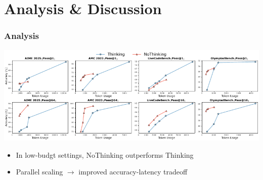 \documentclass[student, noshadow, lsr, english, aspectratio=169]{ITR_LSR_slides}
\begin{document}
\section{Analysis \& Discussion}

\begin{frame}
	\frametitle{Analysis}
	\centering
    \includegraphics[width=\textwidth]{Fig6_Result.pdf}
	\begin{itemize}
		\item In low-budgt settings, NoThinking outperforms Thinking %
		\item Parallel scaling $\rightarrow$ improved accuracy-latency tradeoff%
	\end{itemize}
\end{frame}
\end{document}
